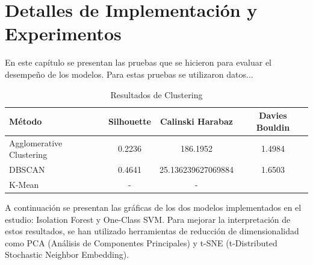 \chapter{Detalles de Implementación y Experimentos}\label{chapter:implementation}

En este capítulo se presentan las pruebas que se hicieron para evaluar
 el desempeño de los modelos. Para estas pruebas se utilizaron datos...

\begin{table}[ht]
    \centering
    \caption{Resultados de Clustering}
    \begin{tabular}{lccc}
        \toprule
        \textbf{Método} & \textbf{Silhouette} & \textbf{Calinski Harabaz} & \textbf{Davies Bouldin} \\
        \midrule
        Agglomerative Clustering & 0.2236 & 186.1952 & 1.4984 \\
        DBSCAN & 0.4641 & 25.136239627069884 & 1.6503 \\
        K-Mean & - & - &
        \bottomrule
    \end{tabular}
\end{table}

A continuación se presentan las gráficas de los dos modelos implementados en el estudio: Isolation Forest y One-Class SVM. Para mejorar la interpretación de estos resultados, se han utilizado herramientas de reducción de dimensionalidad como PCA (Análisis de Componentes Principales) y t-SNE (t-Distributed Stochastic Neighbor Embedding).\\

